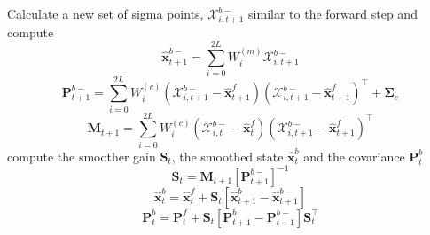 \documentclass[12pt]{iopart}		%
\begin{document}
\begin{algorithm}
\begin{algorithmic}[1]
\begin{equation*}
\end{equation*}
\State Calculate a new set of  sigma points, $\mathcal X_{i,t+1}^{b-}$ similar to the forward step and compute
\begin{equation*}
 \hat{\mathbf x}_{t+1}^{b-}=\sum_{i=0}^{2L} W_i^{(m)}\mathcal X_{i,t+1}^{b-}
\end{equation*}
\begin{equation*}
 \mathbf P_{t +1}^{b-}=\sum_{i=0}^{2L} W_i^{(c)}(\mathcal X_{i,t+1}^{b-}-\hat{\mathbf x}_{t +1}^{f})(\mathcal X_{i,t+1}^{b-}-\hat{\mathbf x}_{t +1}^{f})^\top+\boldsymbol \Sigma_e
\end{equation*}
\begin{equation*}
 \mathbf M_{t +1}=\sum_{i=0}^{2L} W_i^{(c)}(\mathcal X_{i,t}^{b-}-\hat{\mathbf x}_{t}^{f})(\mathcal X_{i,t+1}^{b-}-\hat{\mathbf x}_{t+1}^{f})^\top
\end{equation*}
\State compute the smoother gain $\mathbf S_t$, the smoothed state $\hat{\mathbf x}_t^b $ and the covariance $\mathbf P_{t}^{b} $
\begin{equation*}
\mathbf S_t=\mathbf M_{t +1}\left[ \mathbf P_{t +1}^{b-}\right] ^{-1}
\end{equation*}
\begin{equation*}
 \hat{\mathbf x}_t^b=\hat{\mathbf x}_t^f+\mathbf S_t\left[\hat{\mathbf x}_{t+1}^{b}-\hat{\mathbf x}_{t+1}^{b-}\right] 
\end{equation*}
\begin{equation*}
 \mathbf P_{t}^{b}=\mathbf P_{t}^{f}+\mathbf S_t\left[\mathbf P_{t+1}^{b}-\mathbf P_{t+1}^{b-} \right]\mathbf S_t^\top 
\end{equation*}



\end{algorithmic}
\end{algorithm}
\end{document}
